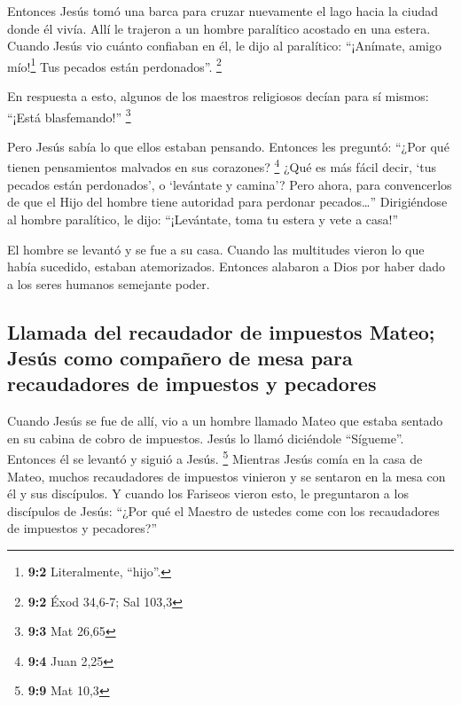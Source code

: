  Entonces Jesús tomó una barca para cruzar nuevamente el
lago hacia la ciudad donde él vivía.  Allí le trajeron a
un hombre paralítico acostado en una estera. Cuando Jesús vio cuánto
confiaban en él, le dijo al paralítico: ``¡Anímate, amigo
mío!\footnote{\textbf{9:2} Literalmente, ``hijo''.} Tus pecados están
perdonados''. \footnote{\textbf{9:2} Éxod 34,6-7; Sal 103,3}

 En respuesta a esto, algunos de los maestros religiosos
decían para sí mismos: ``¡Está blasfemando!'' \footnote{\textbf{9:3} Mat
  26,65}

 Pero Jesús sabía lo que ellos estaban pensando. Entonces
les preguntó: ``¿Por qué tienen pensamientos malvados en sus corazones?
\footnote{\textbf{9:4} Juan 2,25}  ¿Qué es más fácil
decir, `tus pecados están perdonados', o `levántate y camina'?
 Pero ahora, para convencerlos de que el Hijo del hombre
tiene autoridad para perdonar pecados\ldots{}'' Dirigiéndose al hombre
paralítico, le dijo: ``¡Levántate, toma tu estera y vete a casa!''

 El hombre se levantó y se fue a su casa. 
Cuando las multitudes vieron lo que había sucedido, estaban
atemorizados. Entonces alabaron a Dios por haber dado a los seres
humanos semejante poder.

\hypertarget{llamada-del-recaudador-de-impuestos-mateo-jesuxfas-como-compauxf1ero-de-mesa-para-recaudadores-de-impuestos-y-pecadores}{%
\subsection{Llamada del recaudador de impuestos Mateo; Jesús como
compañero de mesa para recaudadores de impuestos y
pecadores}\label{llamada-del-recaudador-de-impuestos-mateo-jesuxfas-como-compauxf1ero-de-mesa-para-recaudadores-de-impuestos-y-pecadores}}

 Cuando Jesús se fue de allí, vio a un hombre llamado
Mateo que estaba sentado en su cabina de cobro de impuestos. Jesús lo
llamó diciéndole ``Sígueme''. Entonces él se levantó y siguió a Jesús.
\footnote{\textbf{9:9} Mat 10,3}  Mientras Jesús comía en
la casa de Mateo, muchos recaudadores de impuestos vinieron y se
sentaron en la mesa con él y sus discípulos.  Y cuando
los Fariseos vieron esto, le preguntaron a los discípulos de Jesús:
``¿Por qué el Maestro de ustedes come con los recaudadores de impuestos
y pecadores?''

